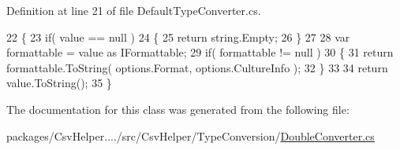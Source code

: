 Definition at line 21 of file Default\-Type\-Converter.\-cs.


\begin{DoxyCode}
22         \{
23             \textcolor{keywordflow}{if}( value == null )
24             \{
25                 \textcolor{keywordflow}{return} string.Empty;
26             \}
27 
28             var formattable = value as IFormattable;
29             \textcolor{keywordflow}{if}( formattable != null )
30             \{
31                 \textcolor{keywordflow}{return} formattable.ToString( options.Format, options.CultureInfo );
32             \}
33 
34             \textcolor{keywordflow}{return} value.ToString();
35         \}
\end{DoxyCode}


The documentation for this class was generated from the following file\-:\begin{DoxyCompactItemize}
\item 
packages/\-Csv\-Helper..../src/\-Csv\-Helper/\-Type\-Conversion/\hyperlink{a00258}{Double\-Converter.\-cs}\end{DoxyCompactItemize}
